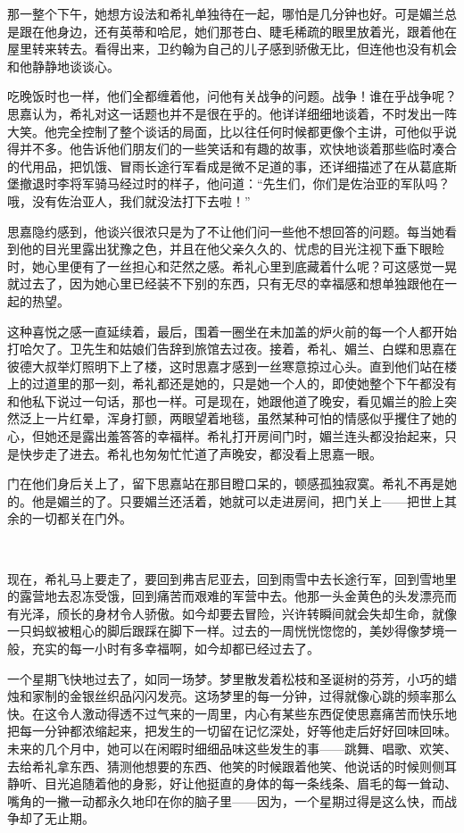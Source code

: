 \par 那一整个下午，她想方设法和希礼单独待在一起，哪怕是几分钟也好。可是媚兰总是跟在他身边，还有英蒂和哈尼，她们那苍白、睫毛稀疏的眼里放着光，跟着他在屋里转来转去。看得出来，卫约翰为自己的儿子感到骄傲无比，但连他也没有机会和他静静地谈谈心。
\par 吃晚饭时也一样，他们全都缠着他，问他有关战争的问题。战争！谁在乎战争呢？思嘉认为，希礼对这一话题也并不是很在乎的。他详详细细地谈着，不时发出一阵大笑。他完全控制了整个谈话的局面，比以往任何时候都更像个主讲，可他似乎说得并不多。他告诉他们朋友们的一些笑话和有趣的故事，欢快地谈着那些临时凑合的代用品，把饥饿、冒雨长途行军看成是微不足道的事，还详细描述了在从葛底斯堡撤退时李将军骑马经过时的样子，他问道：“先生们，你们是佐治亚的军队吗？哦，没有佐治亚人，我们就没法打下去啦！”
\par 思嘉隐约感到，他谈兴很浓只是为了不让他们问一些他不想回答的问题。每当她看到他的目光里露出犹豫之色，并且在他父亲久久的、忧虑的目光注视下垂下眼睑时，她心里便有了一丝担心和茫然之感。希礼心里到底藏着什么呢？可这感觉一晃就过去了，因为她心里已经装不下别的东西，只有无尽的幸福感和想单独跟他在一起的热望。
\par 这种喜悦之感一直延续着，最后，围着一圈坐在未加盖的炉火前的每一个人都开始打哈欠了。卫先生和姑娘们告辞到旅馆去过夜。接着，希礼、媚兰、白蝶和思嘉在彼德大叔举灯照明下上了楼，这时思嘉才感到一丝寒意掠过心头。直到他们站在楼上的过道里的那一刻，希礼都还是她的，只是她一个人的，即使她整个下午都没有和他私下说过一句话，那也一样。可是现在，她跟他道了晚安，看见媚兰的脸上突然泛上一片红晕，浑身打颤，两眼望着地毯，虽然某种可怕的情感似乎攫住了她的心，但她还是露出羞答答的幸福样。希礼打开房间门时，媚兰连头都没抬起来，只是快步走了进去。希礼也匆匆忙忙道了声晚安，都没看上思嘉一眼。
\par 门在他们身后关上了，留下思嘉站在那目瞪口呆的，顿感孤独寂寞。希礼不再是她的。他是媚兰的了。只要媚兰还活着，她就可以走进房间，把门关上——把世上其余的一切都关在门外。
\par  
\par 现在，希礼马上要走了，要回到弗吉尼亚去，回到雨雪中去长途行军，回到雪地里的露营地去忍冻受饿，回到痛苦而艰难的军营中去。他那一头金黄色的头发漂亮而有光泽，颀长的身材令人骄傲。如今却要去冒险，兴许转瞬间就会失却生命，就像一只蚂蚁被粗心的脚后跟踩在脚下一样。过去的一周恍恍惚惚的，美妙得像梦境一般，充实的每一小时有多幸福啊，如今却都已经过去了。
\par 一个星期飞快地过去了，如同一场梦。梦里散发着松枝和圣诞树的芬芳，小巧的蜡烛和家制的金银丝织品闪闪发亮。这场梦里的每一分钟，过得就像心跳的频率那么快。在这令人激动得透不过气来的一周里，内心有某些东西促使思嘉痛苦而快乐地把每一分钟都浓缩起来，把发生的一切留在记忆深处，好等他走后好好回味回味。未来的几个月中，她可以在闲暇时细细品味这些发生的事——跳舞、唱歌、欢笑、去给希礼拿东西、猜测他想要的东西、他笑的时候跟着他笑、他说话的时候则侧耳静听、目光追随着他的身影，好让他挺直的身体的每一条线条、眉毛的每一耸动、嘴角的一撇一动都永久地印在你的脑子里——因为，一个星期过得是这么快，而战争却了无止期。
